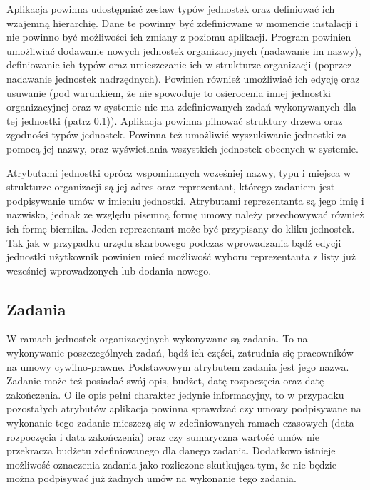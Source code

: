 Aplikacja powinna udostępniać zestaw typów jednostek oraz definiować ich wzajemną hierarchię. Dane te powinny być zdefiniowane w momencie instalacji i nie powinno być możliwości ich zmiany z poziomu aplikacji. Program powinien umożliwiać dodawanie nowych jednostek organizacyjnych (nadawanie im nazwy), definiowanie ich typów oraz umieszczanie ich w strukturze organizacji (poprzez nadawanie jednostek nadrzędnych). Powinien również umożliwiać ich edycję oraz usuwanie (pod warunkiem, że nie spowoduje to osierocenia innej jednostki organizacyjnej oraz w systemie nie ma zdefiniowanych zadań wykonywanych dla tej jednostki (patrz \ref{zadania})). Aplikacja powinna pilnować struktury drzewa oraz zgodności typów jednostek. Powinna też umożliwić wyszukiwanie jednostki za pomocą jej nazwy, oraz wyświetlania wszystkich jednostek obecnych w systemie.

Atrybutami jednostki oprócz wspominanych wcześniej nazwy, typu i miejsca w strukturze organizacji są jej adres oraz reprezentant, którego zadaniem jest podpisywanie umów w imieniu jednostki. Atrybutami reprezentanta są jego imię i nazwisko, jednak ze względu pisemną formę umowy należy przechowywać również ich formę biernika. Jeden reprezentant może być przypisany do kliku jednostek. Tak jak w przypadku urzędu skarbowego podczas wprowadzania bądź edycji jednostki użytkownik powinien mieć możliwość wyboru reprezentanta z listy już wcześniej wprowadzonych lub dodania nowego.


\subsection[Zadania][Zadania]{Zadania}
\label{zadania}
W ramach jednostek organizacyjnych wykonywane są zadania. To na wykonywanie poszczególnych zadań, bądź ich części, zatrudnia się pracowników na umowy cywilno-prawne. Podstawowym atrybutem zadania jest jego nazwa. Zadanie może też posiadać swój opis, budżet, datę rozpoczęcia oraz datę zakończenia. O ile opis pełni charakter jedynie informacyjny, to w przypadku pozostałych atrybutów aplikacja powinna sprawdzać czy umowy podpisywane na wykonanie tego zadanie mieszczą się w zdefiniowanych ramach czasowych (data rozpoczęcia i data zakończenia) oraz czy sumaryczna wartość umów nie przekracza budżetu zdefiniowanego dla danego zadania. Dodatkowo istnieje możliwość oznaczenia zadania jako rozliczone skutkująca tym, że nie będzie można podpisywać już żadnych umów na wykonanie tego zadania. 

